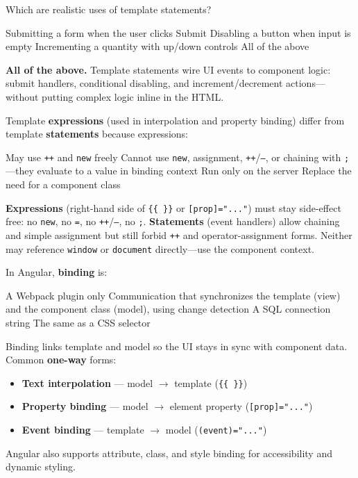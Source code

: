 \question[4]
Which are realistic uses of template statements?
\begin{choices}
  \choice Submitting a form when the user clicks Submit
  \choice Disabling a button when input is empty
  \choice Incrementing a quantity with up/down controls
  \CorrectChoice All of the above
\end{choices}
\begin{solution}
  \textbf{All of the above.} Template statements wire UI events to component logic: submit handlers, conditional disabling, and increment/decrement actions---without putting complex logic inline in the HTML.
\end{solution}

\question[4]
Template \textbf{expressions} (used in interpolation and property binding) differ from template \textbf{statements} because expressions:
\begin{choices}
  \choice May use \texttt{++} and \texttt{new} freely
  \CorrectChoice Cannot use \texttt{new}, assignment, \texttt{++}/\texttt{--}, or chaining with \texttt{;}---they evaluate to a value in binding context
  \choice Run only on the server
  \choice Replace the need for a component class
\end{choices}
\begin{solution}
  \textbf{Expressions} (right-hand side of \lstinline[style=htmlinline]|{{ }}| or \lstinline[style=htmlinline]|[prop]="..."|) must stay side-effect free: no \texttt{new}, no \texttt{=}, no \texttt{++}/\texttt{--}, no \texttt{;}. \textbf{Statements} (event handlers) allow chaining and simple assignment but still forbid \texttt{++} and operator-assignment forms. Neither may reference \texttt{window} or \texttt{document} directly---use the component context.
\end{solution}

\question[4]
In Angular, \textbf{binding} is:
\begin{choices}
  \choice A Webpack plugin only
  \CorrectChoice Communication that synchronizes the template (view) and the component class (model), using change detection
  \choice A SQL connection string
  \choice The same as a CSS selector
\end{choices}
\begin{solution}
  Binding links template and model so the UI stays in sync with component data. Common \textbf{one-way} forms:
  \begin{itemize}
    \item \textbf{Text interpolation} --- model $\rightarrow$ template (\lstinline[style=htmlinline]|{{ }}|)
    \item \textbf{Property binding} --- model $\rightarrow$ element property (\lstinline[style=htmlinline]|[prop]="..."|)
    \item \textbf{Event binding} --- template $\rightarrow$ model (\lstinline[style=htmlinline]|(event)="..."|)
  \end{itemize}
  Angular also supports attribute, class, and style binding for accessibility and dynamic styling.
\end{solution}

